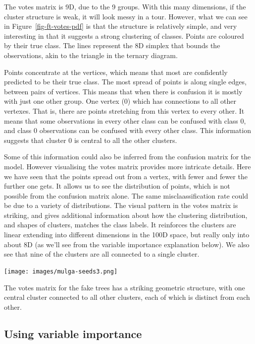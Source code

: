\documentclass[
  letterpaper,
]{krantz}
\newcommand{\insightbox}[1]{%
\noindent\colorbox{insight!30}{%
\begin{minipage}{0.98\textwidth}%
    \centering%
    \begin{minipage}[c]{0.15\textwidth} %
      \texttt{[image: images/mulga-seeds3.png]} %
    \end{minipage}%
    \hfill %
    \begin{minipage}[c]{0.8\textwidth} %
      \bigskip%
      \textsf{#1}%
      \bigskip%
    \end{minipage}%
    \hspace*{3mm}%
  \end{minipage}%
}%
}
\begin{document}
 The votes matrix is 9D, due to the 9 groups.
With this many dimensions, if the cluster structure is weak, it will
look messy in a tour. However, what we can see in
Figure~\ref{fig-ft-votes-pdf} is that the structure is relatively
simple, and very interesting in that it suggests a strong clustering of
classes. Points are coloured by their true class. The lines represent
the 8D simplex that bounds the observations, akin to the triangle in the
ternary diagram.

Points concentrate at the vertices, which means that most are
confidently predicted to be their true class. The most spread of points
is along single edges, between pairs of vertices. This means that when
there is confusion it is mostly with just one other group. One vertex
(0) which has connections to all other vertexes. That is, there are
points stretching from this vertex to every other. It means that some
observations in every other class can be confused with class 0, and
class 0 observations can be confused with every other class. This
information suggests that cluster 0 is central to all the other
clusters.

Some of this information could also be inferred from the confusion
matrix for the model. However visualising the votes matrix provides more
intricate details. Here we have seen that the points spread out from a
vertex, with fewer and fewer the further one gets. It allows us to see
the distribution of points, which is not possible from the confusion
matrix alone. The same misclaassification rate could be due to a variety
of distributions. The visual pattern in the votes matrix is striking,
and gives additional information about how the clustering distribution,
and shapes of clusters, matches the class labels. It reinforces the
clusters are linear extending into different dimensions in the 100D
space, but really only into about 8D (as we'll see from the variable
importance explanation below). We also see that nine of the clusters are
all connected to a single cluster.

\insightbox{The votes matrix for the fake trees has a striking geometric structure, with one central cluster connected to all other clusters, each of which is distinct from each other.}

\hypertarget{sec-forest-var-imp}{%
\subsection{Using variable importance}\label{sec-forest-var-imp}}
\end{document}
